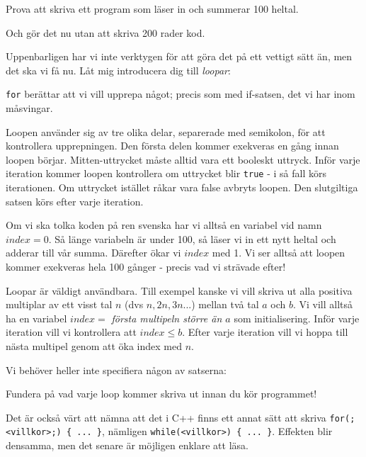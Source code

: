 Prova att skriva ett program som läser in och summerar 100 heltal.

Och gör det nu utan att skriva 200 rader kod.

Uppenbarligen har vi inte verktygen för att göra det på ett vettigt sätt än, men det ska vi få nu. Låt mig introducera dig till \emph{loopar}:



\texttt{for} berättar att vi vill upprepa något; precis som med if-satsen, det vi har inom måsvingar. 

Loopen använder sig av tre olika delar, separerade med semikolon, för att kontrollera upprepningen. Den första delen kommer exekveras en gång innan loopen börjar. Mitten-uttrycket måste alltid vara ett booleskt uttryck. Inför varje iteration kommer loopen kontrollera om uttrycket blir \texttt{true} - i så fall körs iterationen. Om uttrycket istället råkar vara false avbryts loopen. Den slutgiltiga satsen körs efter varje iteration.

Om vi ska tolka koden på ren svenska har vi alltså en variabel vid namn $index = 0$. Så länge variabeln är under 100, så läser vi in ett nytt heltal och adderar till vår summa. Därefter ökar vi $index$ med 1. Vi ser alltså att loopen kommer exekveras hela 100 gånger - precis vad vi strävade efter!

Loopar är väldigt användbara. Till exempel kanske vi vill skriva ut alla positiva multiplar av ett visst tal $n$ (dvs $n, 2n, 3n...$) mellan två tal $a$ och $b$. Vi vill alltså ha en variabel $index = $ \emph{första multipeln större än $a$} som initialisering. Inför varje iteration vill vi kontrollera att $index \le b$. Efter varje iteration vill vi hoppa till nästa multipel genom att öka index med $n$.



Vi behöver heller inte specifiera någon av satserna:



Fundera på vad varje loop kommer skriva ut innan du kör programmet!

Det är också värt att nämna att det i C++ finns ett annat sätt att skriva \texttt{for(;<villkor>;) \{ ... \}}, nämligen \texttt{while(<villkor>) \{ ... \}}. Effekten blir densamma, men det senare är möjligen enklare att läsa.